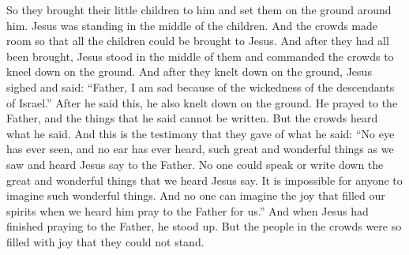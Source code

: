 So they brought their little children to him and set them on the ground around him. Jesus was standing in the middle of the children. And the crowds made room so that all the children could be brought to Jesus.
\bverse \iffalse And it came to pass that when they had all been brought, and Jesus stood in the midst, he commanded the multitude that they should kneel down upon the ground. \fi
And after they had all been brought, Jesus stood in the middle of them and commanded the crowds to kneel down on the ground.
\bverse \iffalse And it came to pass that when they had knelt upon the ground, Jesus groaned within himself, and said: Father, I am troubled because of the wickedness of the people of the house of Israel. \fi
And after they knelt down on the ground, Jesus sighed and said: ``Father, I am sad because of the wickedness of the descendants of Israel.''
\bverse \iffalse And when he had said these words, he himself also knelt upon the earth; and behold he prayed unto the Father, and the things which he prayed cannot be written, and the multitude did bear record who heard him. \fi
After he said this, he also knelt down on the ground. He prayed to the Father, and the things that he said cannot be written. But the crowds heard what he said.
\bverse \iffalse And after this manner do they bear record: The eye hath never seen, neither hath the ear heard, before, so great and marvelous things as we saw and heard Jesus speak unto the Father; \fi
And this is the testimony that they gave of what he said: ``No eye has ever seen, and no ear has ever heard, such great and wonderful things as we saw and heard Jesus say to the Father.
\bverse \iffalse And no tongue can speak, neither can there be written by any man, neither can the hearts of men conceive so great and marvelous things as we both saw and heard Jesus speak; and no one can conceive of the joy which filled our souls at the time we heard him pray for us unto the Father. \fi
No one could speak or write down the great and wonderful things that we heard Jesus say. It is impossible for anyone to imagine such wonderful things. And no one can imagine the joy that filled our spirits when we heard him pray to the Father for us.''
\bverse \iffalse And it came to pass that when Jesus had made an end of praying unto the Father, he arose; but so great was the joy of the multitude that they were overcome. \fi
And when Jesus had finished praying to the Father, he stood up. But the people in the crowds were so filled with joy that they could not stand.
